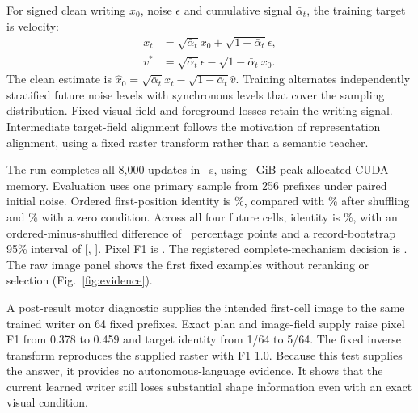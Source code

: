 For signed clean writing $x_0$, noise $\epsilon$ and cumulative signal
$\bar\alpha_t$, the training target is velocity:
\begin{align}
x_t&=\sqrt{\bar\alpha_t}x_0+\sqrt{1-\bar\alpha_t}\epsilon,\\
v^*&=\sqrt{\bar\alpha_t}\epsilon-\sqrt{1-\bar\alpha_t}x_0.
\end{align}
The clean estimate is
$\hat x_0=\sqrt{\bar\alpha_t}x_t-\sqrt{1-\bar\alpha_t}\hat v$.
Training alternates independently stratified future noise levels with
synchronous levels that cover the sampling distribution. Fixed visual-field
and foreground losses retain the writing signal. Intermediate target-field
alignment follows the motivation of representation alignment\cite{repa},
using a fixed raster transform rather than a semantic teacher.

The run completes all 8,000 updates in \TrainSeconds\ s, using
\TrainMemory\ GiB peak allocated CUDA memory. Evaluation uses one primary
sample from 256 prefixes under paired initial noise. Ordered first-position
identity is \FirstIdentity\%, compared with \FirstShuffled\% after shuffling
and \FirstZero\% with a zero condition. Across all four future cells, identity
is \BlockIdentity\%, with an ordered-minus-shuffled difference of
\BlockGain\ percentage points and a record-bootstrap 95\% interval of
[\BlockLow, \BlockHigh]. Pixel F1 is \BlockFone.
The registered complete-mechanism decision is \texttt{\RunDecision}.
The raw image panel shows the first fixed examples without reranking or
selection (Fig.~\ref{fig:evidence}).

A post-result motor diagnostic supplies the intended first-cell image to the
same trained writer on 64 fixed prefixes. Exact plan and image-field supply
raise pixel F1 from 0.378 to 0.459 and target identity from 1/64 to 5/64.
The fixed inverse transform reproduces the supplied raster with F1 1.0.
Because this test supplies the answer, it provides no autonomous-language
evidence. It shows that the current learned writer still loses substantial
shape information even with an exact visual condition.



